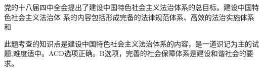 \question 党的十八届四中全会提出了建设中国特色社会主义法治体系的总目标。建设中国特色社会主义法治体
系的内容包括形成完备的法律规范体系、高效的法治实施体系和
\par{}
\begin{solution}此题考查的知识点是建设中国特色社会主义法治体系的内容，是一道识记为主的试题,难度适中。ACD选项正确。B选项，完善的社会保障体系是建设和谐社会的要求。
\end{solution}
